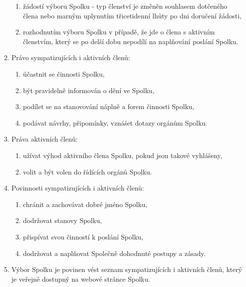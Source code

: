\documentclass[11pt,a4paper]{article}
\begin{document}
\begin{enumerate}[itemsep=0pt]
\begin{enumerate}[itemsep=0pt,topsep=0pt]
        \item žádostí výboru Spolku - typ členství je změněn souhlasem dotčeného člena nebo marným uplynutím třicetidenní lhůty po dni doručení žádosti,
        \item rozhodnutím výboru Spolku v případě, že jde o člena s aktivním členstvím, který se po delší dobu nepodílí na naplňování poslání Spolku.
    \end{enumerate}
    \item Právo sympatizujících i aktivních členů:
    \begin{enumerate}[itemsep=0pt,topsep=0pt]
        \item účastnit se činnosti Spolku,
        \item být pravidelně informován o dění ve Spolku,
        \item podílet se na stanovování náplně a forem činnosti Spolku,
        \item podávat návrhy, připomínky, vznášet dotazy orgánům Spolku.
    \end{enumerate}
    \item Práva aktivních členů:
    \begin{enumerate}[itemsep=0pt,topsep=0pt]
        \item užívat výhod aktivního člena Spolku, pokud jsou takové vyhlášeny,
        \item volit a být volen do řídících orgánů Spolku.
    \end{enumerate}
    \item Povinnosti sympatizujících i aktivních členů:
    \begin{enumerate}[itemsep=0pt,topsep=0pt]
        \item chránit a zachovávat dobré jméno Spolku,
        \item dodržovat stanovy Spolku,
        \item přispívat svou činností k poslání Spolku,
        \item dodržovat a naplňovat Společně dohodnuté postupy a zásady.
    \end{enumerate}
    \item Výbor Spolku je povinen vést seznam sympatizujících i aktivních členů,
    který je veřejně dostupný na webové stránce Spolku. 
\end{enumerate}
\end{document}
